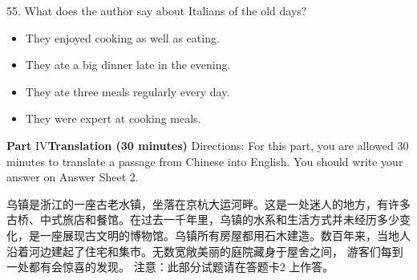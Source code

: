 \documentclass[UTF8,11pt]{ctexart}
\begin{document}
55. What does the author say about Italians of the old days?


\begin{itemize}[leftmargin=2em,itemsep=.2em,topsep=.4em]\item[A.] They enjoyed cooking as well as eating.
\item[B.] They ate a big dinner late in the evening.
\item[C.] They ate three meals regularly every day.
\item[D.] They were expert at cooking meals.
\end{itemize}

\textbf{Part} IV\textbf{Translation (30 minutes)} Directions: For this part, you are allowed 30 minutes to translate a passage from Chinese into English. You should write your answer on Answer Sheet 2.


乌镇是浙江的一座古老水镇，坐落在京杭大运河畔。这是一处迷人的地方，有许多古桥、中式旅店和餐馆。在过去一千年里，乌镇的水系和生活方式并未经历多少变化，是一座展现古文明的博物馆。乌镇所有房屋都用石木建造。数百年来，当地人沿着河边建起了住宅和集市。无数宽敞美丽的庭院藏身于屋舍之间， 游客们每到一处都有会惊喜的发现。 注意：此部分试题请在答题卡2 上作答。
\end{document}
